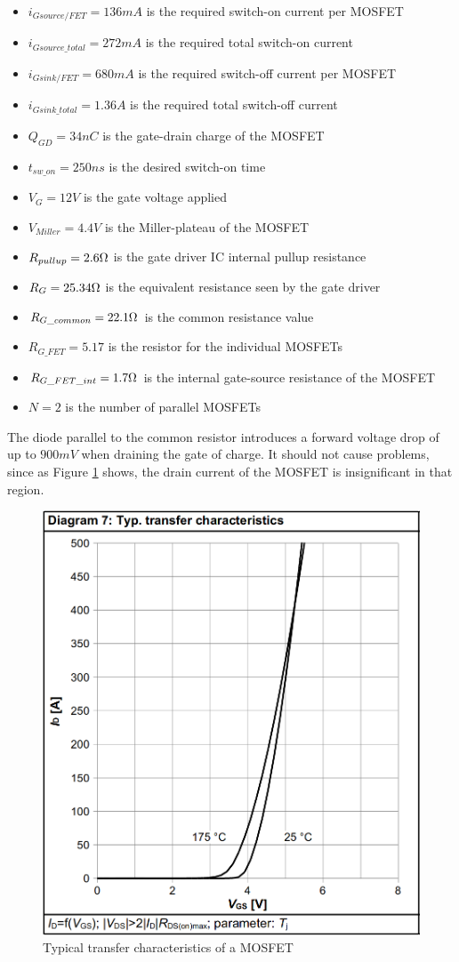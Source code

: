     \begin{itemize}
        \item $i_{Gsource/FET} = 136 mA$ is the required switch-on current per MOSFET
        \item $i_{Gsource{\_}total} = 272 mA$ is the required total switch-on current
        \item $i_{Gsink/FET} = 680 mA$ is the required switch-off current per MOSFET
        \item $i_{Gsink{\_}total} = 1.36 A$ is the required total switch-off current
        \item $Q_{GD} = 34 nC$ is the gate-drain charge of the MOSFET
        \item $t_{sw{\_}on} = 250 ns$ is the desired switch-on time
        \item $V_G = 12V$ is the gate voltage applied
        \item $V_{Miller} = 4.4 V$ is the Miller-plateau of the MOSFET
        \item $R_{pullup} = 2.6 \ohm$ is the gate driver IC internal pullup resistance
        \item $R_G = 25.34 \ohm$ is the equivalent resistance seen by the gate driver
        \item $R_{G{\_}common} = 22.1 \ohm$ is the common resistance value
        \item $R_{G{\_}FET} = 5.17$ is the resistor for the individual MOSFETs
        \item $R_{G{\_}FET{\_}int} = 1.7 \ohm$ is the internal gate-source resistance of the MOSFET
        \item $N = 2$ is the number of parallel MOSFETs
    \end{itemize}
    
    The diode parallel to the common resistor introduces a forward voltage drop of up to $900 mV$ when draining the gate of charge. It should not cause problems, since as Figure \ref{fig:mosfet_transfer_char} shows, the drain current of the MOSFET is insignificant in that region.
    
\begin{figure}[H]
	\centering
	\includegraphics[width=0.6\linewidth]{pictures/hardware/Driver_Board/mosfet_transfer_char.png}
	\caption{Typical transfer characteristics of a MOSFET}
	\label{fig:mosfet_transfer_char}
\end{figure}